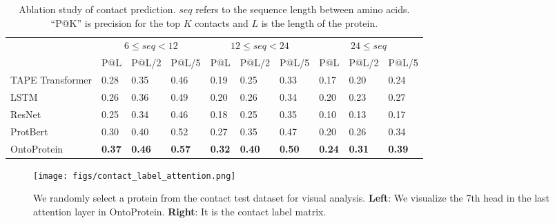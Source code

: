  

\begin{table}[]
\begin{tabular}{p{3.0cm}p{0.6cm}p{0.8cm}p{0.8cm}p{0.6cm}p{0.8cm}p{0.8cm}p{0.6cm}p{0.8cm}p{0.8cm}}
\toprule
\multirow{2}{*}{}     & \multicolumn{3}{c}{$6 \le seq < 12$} & \multicolumn{3}{c}{$12 \le seq < 24$} & \multicolumn{3}{c}{$24 \le seq$} \\
                      & P@L & P@L/2 & P@L/5 & P@L & P@L/2 & P@L/5 & P@L & P@L/2 & P@L/5     \\
\midrule
TAPE Transformer & 0.28   & 0.35   & 0.46   & 0.19    & 0.25   & 0.33   & 0.17   & 0.20  & 0.24  \\
LSTM       & 0.26   & 0.36   & 0.49   & 0.20    & 0.26   & 0.34   & 0.20   & 0.23  & 0.27  \\
ResNet     & 0.25   & 0.34   & 0.46   & 0.18    & 0.25   & 0.35   & 0.10   & 0.13  & 0.17  \\
ProtBert       & 0.30 & 0.40 & 0.52 & 0.27 & 0.35 & 0.47 & 0.20 & 0.26 & 0.34 \\
OntoProtein       & \textbf{0.37} & \textbf{0.46} & \textbf{0.57} & \textbf{0.32} & \textbf{0.40} & \textbf{0.50} & \textbf{0.24} & \textbf{0.31} & \textbf{0.39} \\
\bottomrule
\end{tabular}
\caption{
Ablation study of contact prediction. 
$seq$ refers to the sequence length between amino acids.
“P@K” is precision for the top $K$ contacts and $L$ is the length of the protein.}
\label{Contact Prediction}
\end{table}

\begin{figure*}[t]
\centering
\texttt{[image: figs/contact\_label\_attention.png]}
\caption{
We randomly select a protein from the contact test dataset for visual analysis.
\textbf{Left}: We visualize the 7th head in the last attention layer in OntoProtein. \textbf{Right}: It is the  contact label matrix.
}
\label{fig:attention}
\end{figure*}


